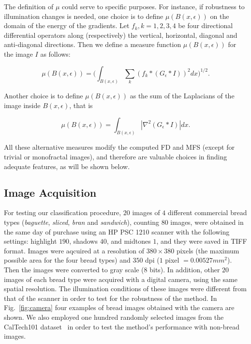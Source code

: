 The definition of $\mu$ could serve to specific purposes. For instance, if robustness to illumination changes is needed, one choice is to define $\mu(B(x,\epsilon))$ on the domain of the energy of the gradients. Let ${ f_{k} , k = 1, 2, 3, 4}$ be four directional differential operators along (respectively) the vertical, horizontal, diagonal and anti-dia\-gonal directions. Then we define a measure function $\mu(B(x,\epsilon))$ for the image $I$ as follows:

\begin{equation}
\mu(B(x,\epsilon)) = (\int_{B(x,\epsilon)}{\sum_{k}{(f_{k} \ast (G_{\epsilon} \ast I))^{2}} dx)^{1/2}}.
\label{eqn:gradient}
\end{equation}

Another choice is to define $\mu(B(x, \epsilon))$ as the sum of the Laplacians of the image inside $B(x, \epsilon)$, that is

\begin{equation}
\mu(B(x,\epsilon)) = \int_{B(x,\epsilon)}|\nabla^2 (G_{\epsilon} \ast I)| dx.
\label{eqn:laplacian}
\end{equation}

All these alternative measures modify the computed FD and MFS (except for trivial or monofractal images), and therefore are valuable choices in finding adequate features, as will be shown below.

\subsection{Image Acquisition}
\label{sec:7}
For testing our classification procedure, $20$ images of $4$ different commercial bread types ({\em baguette}, {\em sliced}, {\em bran} and {\em sandwich}), counting $80$ images, were obtained in the same day of purchase using an HP PSC 1210 scanner with the following settings: highlight $190$, shadows $40$, and midtones $1$, and they were saved in TIFF format. Images were aqcuired at a resolution of $380 \times 380$ pixels (the maximum possible area for the four bread types) and $350$ dpi ($1$ pixel $= 0.00527 mm^{2}$). Then the images were converted to gray scale ($8$ bits). In addition, other $20$ images of each bread type were acquired with a digital camera, using the same spatial resolution. The illumination conditions of these images were different from that of the scanner in order to test for the robustness of the method. In Fig.~\ref{fig:camera} four examples of bread images obtained with the camera are shown. We also employed one hundred randomly selected images from the CalTech101 dataset~\cite{FeiFei04} in order to test the method's performance with non-bread images.

